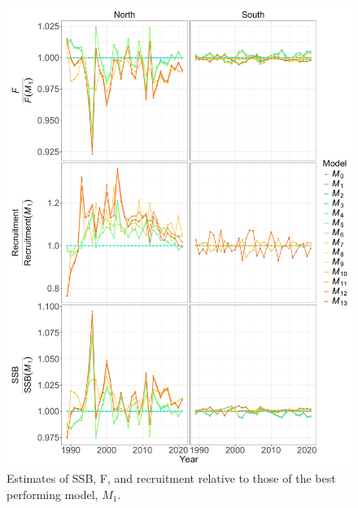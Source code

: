 \documentclass[
]{article}
\begin{document}
\begin{figure}

{\centering \includegraphics[height=0.95\textheight]{SSB_F_R_rel_M1} 

}

\caption{Estimates of SSB, F, and recruitment relative to those of the best performing model, $M_1$.}\label{fig:SSB-F-R-rel-M1}
\end{figure}
\end{document}
